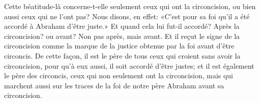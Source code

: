 Cette béatitude-là concerne-t-elle seulement ceux qui ont la circoncision,
	ou bien aussi ceux qui ne l’ont pas?
Nous disons, en effet:
	«C’est pour sa foi qu’il a été accordé à Abraham d’être juste.»
Et quand cela lui fut-il accordé? Après la circoncision? ou avant?
	Non pas après, mais avant.
Et il reçut le signe de la circoncision
		comme la marque de la justice obtenue par la foi avant d’être circoncis.
De cette façon,
	il est le père de tous ceux qui croient sans avoir la circoncision,
	pour qu’à eux aussi, il soit accordé d’être justes;
	et il est également le père des circoncis,
	ceux qui non seulement ont la circoncision,
	mais qui marchent aussi sur les traces de la foi de notre père Abraham
		avant sa circoncision.
